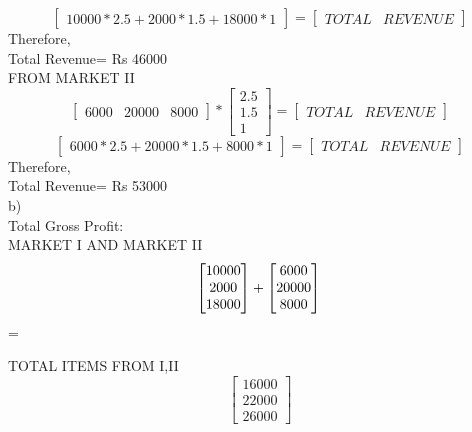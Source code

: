 \documentclass{article}
\begin{document}
\begin{itemize}
\[\]
 
 \[
\begin{bmatrix}
  10000*2.5+2000*1.5+18000*1
 \end{bmatrix}
 =
 \begin{bmatrix}
        TOTAL & REVENUE
 \end{bmatrix}
 \]
 Therefore,\\
 
 Total Revenue= Rs 46000\\
 
 FROM MARKET II\\
 
 
 \[
\begin{bmatrix}
   6000 & 20000 & 8000            
 \end{bmatrix} 
      *
 \begin{bmatrix}
        2.5\\
        1.5\\
        1
 \end{bmatrix}
 =
\begin{bmatrix}
       TOTAL & REVENUE
 \end{bmatrix} 
\]
 \[
\begin{bmatrix}
  6000*2.5+20000*1.5+8000*1
 \end{bmatrix}
 =
 \begin{bmatrix}
        TOTAL & REVENUE
 \end{bmatrix}
 \]
Therefore,\\
 Total Revenue= Rs 53000\\
 \newpage
 b)\\
 
Total Gross Profit:\\
MARKET I AND MARKET II\\
 \[
\begin{bmatrix}
  10000\\
   2000\\
   18000
 \end{bmatrix}
 +
 \begin{bmatrix}
  6000\\
   20000\\
   8000 
 \end{bmatrix}\\
 \]
 =

TOTAL ITEMS FROM I,II\\
\[
 \begin{bmatrix}
  16000\\
  22000\\
  26000 
 \end{bmatrix} 
 \]


\end{itemize}
\end{document}
